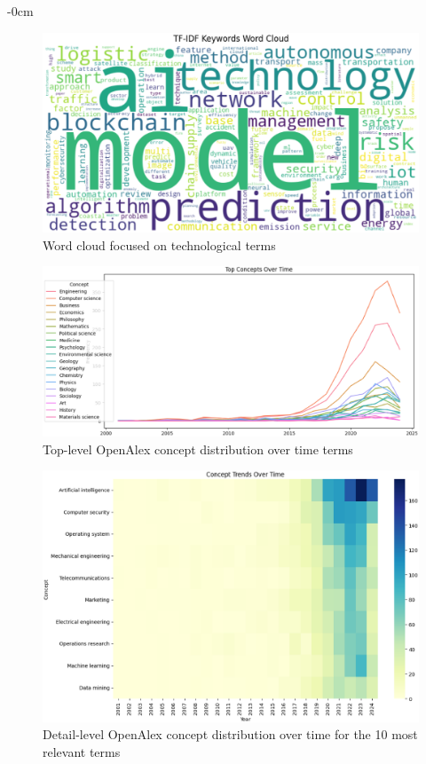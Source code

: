 \documentclass[jmse,review,submit,pdftex,moreauthors]{Definitions/mdpi}
\begin{document}
\begin{adjustwidth}{-\extralength}{0cm}
\begin{figure}[H]
	\centering
	\includegraphics[width=\linewidth]{pics/wordcloud_2.eps}
	\caption{Word cloud focused on technological terms}\label{fig:fig12}
\end{figure}

\begin{figure}[H]
	\centering
	\includegraphics[width=\linewidth]{pics/main_concept_trend_toplevel.eps}
	\caption{Top-level OpenAlex concept distribution over time terms}\label{fig:fig13}
\end{figure}

\begin{figure}[H]
	\centering
	\includegraphics[width=\linewidth]{pics/main_concept_trend_lowerlevels.eps}
	\caption{Detail-level OpenAlex concept distribution over time for the 10 most relevant terms}\label{fig:fig14}
\end{figure}


\end{adjustwidth}
\end{document}
